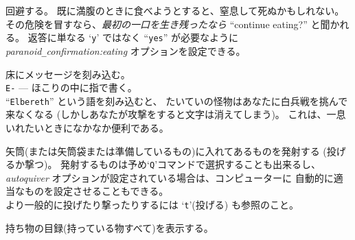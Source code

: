 回避する。
既に満腹のときに食べようとすると、窒息して死ぬかもしれない。
その危険を冒すなら、{\it 最初の一口を生き残ったなら \/}
``continue eating?'' と聞かれる。
返答に単なる `{\tt y}' ではなく ``{\tt yes}'' が必要なように
{\it paranoid\verb+_+confirmation:eating\/} オプションを設定できる。
\item[\tb{E}]
床にメッセージを刻み込む。\\
{\tt E-} --- ほこりの中に指で書く。\\
``{\tt Elbereth}'' という語を刻み込むと、
たいていの怪物はあなたに白兵戦を挑んで来なくなる
(しかしあなたが攻撃をすると文字は消えてしまう)。
これは、一息いれたいときになかなか便利である。
\item[\tb{f}]
矢筒(または矢筒袋または準備しているもの)に入れてあるものを発射する
(投げるか撃つ)。
発射するものは予め`{\tt Q}'コマンドで選択することも出来るし、
{\it autoquiver\/} オプションが設定されている場合は、コンピューターに
自動的に適当なものを設定させることもできる。\\
より一般的に投げたり撃ったりするには `{\tt t}'(投げる) も参照のこと。
\item[\tb{i}]
持ち物の目録(持っている物すべて)を表示する。
